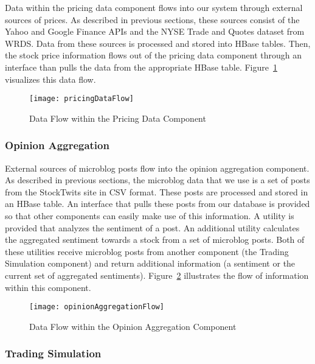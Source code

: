 Data within the pricing data component flows into our system through external sources of prices. As described in previous sections, these sources consist of the Yahoo and Google Finance APIs and the NYSE Trade and Quotes dataset from WRDS. Data from these sources is processed and stored into HBase tables. Then, the stock price information flows out of the pricing data component through an interface than pulls the data from the appropriate HBase table. Figure~\ref{pricingDataFlow} visualizes this data flow.

\begin{figure}[h]
  \label{pricingDataFlow}
  \begin{center}
    \texttt{[image: pricingDataFlow]}
  \end{center}
  \caption{Data Flow within the Pricing Data Component}
\end{figure}

\subsubsection{Opinion Aggregation}

External sources of microblog posts flow into the opinion aggregation component. As described in previous sections, the microblog data that we use is a set of posts from the StockTwits site in CSV format. These posts are processed and stored in an HBase table. An interface that pulls these posts from our database is provided so that other components can easily make use of this information. A utility is provided that analyzes the sentiment of a post. An additional utility calculates the aggregated sentiment towards a stock from a set of microblog posts. Both of these utilities receive microblog posts from another component (the Trading Simulation component) and return additional information (a sentiment or the current set of aggregated sentiments). Figure~\ref{opinionAggregationFlow} illustrates the flow of information within this component.

\begin{figure}[h]
  \label{opinionAggregationFlow}
  \begin{center}
    \texttt{[image: opinionAggregationFlow]}
  \end{center}
  \caption{Data Flow within the Opinion Aggregation Component}
\end{figure}

\subsubsection{Trading Simulation}

